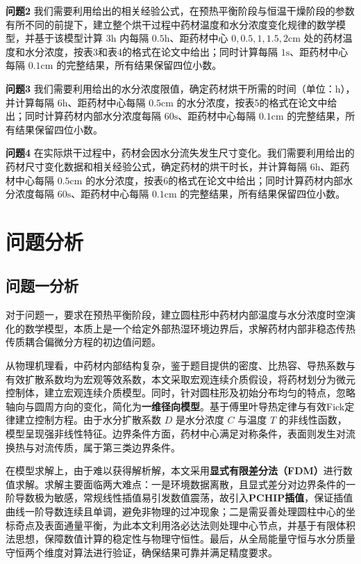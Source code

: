 \documentclass[withoutpreface,bwprint]{cumcm_thesis}
\begin{document}
\textbf{问题2 }  
我们需要利用给出的相关经验公式，在预热平衡阶段与恒温干燥阶段的参数有所不同的前提下，建立整个烘干过程中药材温度和水分浓度变化规律的数学模型，并基于该模型计算 \(3\mathrm{h}\) 内每隔 \(0.5\mathrm{h}\)、距药材中心 \(0,0.5,1,1.5,2\mathrm{cm}\) 处的药材温度和水分浓度，按表3和表4的格式在论文中给出；同时计算每隔 \(1\mathrm{s}\)、距药材中心每隔 \(0.1\mathrm{cm}\) 的完整结果，所有结果保留四位小数。

\textbf{问题3}  
我们需要利用给出的水分浓度限值，确定药材烘干所需的时间（单位：\(\mathrm{h}\)），并计算每隔 \(6\mathrm{h}\)、距药材中心每隔 \(0.5\mathrm{cm}\) 的水分浓度，按表5的格式在论文中给出；同时计算药材内部水分浓度每隔 \(60\mathrm{s}\)、距药材中心每隔 \(0.1\mathrm{cm}\) 的完整结果，所有结果保留四位小数。

\textbf{问题4}  
在实际烘干过程中，药材会因水分流失发生尺寸变化。我们需要利用给出的药材尺寸变化数据和相关经验公式，确定药材的烘干时长，并计算每隔 \(6\mathrm{h}\)、距药材中心每隔 \(0.5\mathrm{cm}\) 的水分浓度，按表6的格式在论文中给出；同时计算药材内部水分浓度每隔 \(60\mathrm{s}\)、距药材中心每隔 \(0.1\mathrm{cm}\) 的完整结果，所有结果保留四位小数。






\section{问题分析}
\subsection{问题一分析}

对于问题一，要求在预热平衡阶段，建立圆柱形中药材内部温度与水分浓度时空演化的数学模型，本质上是一个给定外部热湿环境边界后，求解药材内部非稳态传热传质耦合偏微分方程的初边值问题。

从物理机理看，中药材内部结构复杂，鉴于题目提供的密度、比热容、导热系数与有效扩散系数均为宏观等效系数，本文采取宏观连续介质假设，将药材划分为微元控制体，建立宏观连续介质模型。同时，针对圆柱形及初始分布均匀的特点，忽略轴向与圆周方向的变化，简化为\textbf{一维径向模型}。基于傅里叶导热定律与有效Fick定律建立控制方程。由于水分扩散系数 \(D\) 是水分浓度 \(C\) 与温度 \(T\) 的非线性函数，模型呈现强非线性特征。边界条件方面，药材中心满足对称条件，表面则发生对流换热与对流传质，属于第三类边界条件。

在模型求解上，由于难以获得解析解，本文采用\textbf{显式有限差分法（FDM）}进行数值求解。求解主要面临两大难点：一是环境数据离散，且显式差分对边界条件的一阶导数极为敏感，常规线性插值易引发数值震荡，故引入\textbf{PCHIP插值}，保证插值曲线一阶导数连续且单调，避免非物理的过冲现象；二是需妥善处理圆柱中心的坐标奇点及表面通量平衡，为此本文利用洛必达法则处理中心节点，并基于有限体积法思想，保障数值计算的稳定性与物理守恒性。最后，从全局能量守恒与水分质量守恒两个维度对算法进行验证，确保结果可靠并满足精度要求。
\end{document}
